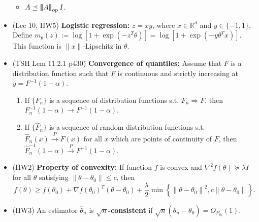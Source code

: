 \documentclass[twoside]{article}
\newcommand{\norm}[1]{\left\|{#1}\right\|} %
\newcommand{\matrixnorm}[1]{\left|\!\left|\!\left|{#1}
  \right|\!\right|\!\right|} %
\newcommand{\opnorm}[1]{\matrixnorm{#1}_{\rm op}}
\newcommand\bbR{\mathbb{R}}
\newcommand\lmb{\lambda}
\def\t{\theta}
\newcommand\cp{\stackrel{P}{\goesto}}
\newcommand\goesto{\rightarrow}
\begin{document}
\begin{itemize}
\begin{itemize}
\item $A \preceq \opnorm{A} I$.
\end{itemize}

\item (Lec 10, HW5) \textbf{Logistic regression:} $z = xy$, where $x \in \bbR^d$ and $y \in \{-1, 1\}$. Define $m_\t(z) := \log \left[ 1 + \exp(-z^T\t)\right] = \log \left[ 1 + \exp(-y \t^T x)\right]$. This function is $\|x\|$-Lipschitz in $\t$.

\item (TSH Lem 11.2.1 p430) \textbf{Convergence of quantiles:} Assume that $F$ is a distribution function such that $F$ is continuous and strictly increasing at $y = F^{-1}(1-\alpha)$.
\begin{enumerate}
\item If $\{ F_n \}$ is a sequence of distribution functions s.t. $F_n \Rightarrow F$, then $F_n^{-1}(1-\alpha) \goesto F^{-1}(1-\alpha)$.

\item If $\{ \hat{F}_n \}$ is a sequence of random distribution functions s.t. $\hat{F}_n(x) \cp F(x)$ for all $x$ which are points of continuity of $F$, then $\hat{F}_n^{-1}(1-\alpha) \cp F^{-1}(1-\alpha)$.
\end{enumerate}

\item (HW2) \textbf{Property of convexity:} If function $f$ is convex and $\nabla^2 f(\t) \succeq \lmb I$ for all $\t$ satisfying $\norm{\t - \t_0} \leq c$, then
\[ f(\t) \geq f(\t_0) + \nabla f(\t_0)^T (\t - \t_0) + \frac{\lmb}{2} \min \left\{\norm{\t - \t_0}^2, c\norm{\t - \t_0} \right\}. \]

\item (HW3) An estimator $\hat{\t}_n$ is \textbf{$\sqrt{n}$-consistent} if $\sqrt{n}(\hat{\t}_n - \t_0) = O_{P_{\t_0}}(1)$.



\end{itemize}
\end{document}
